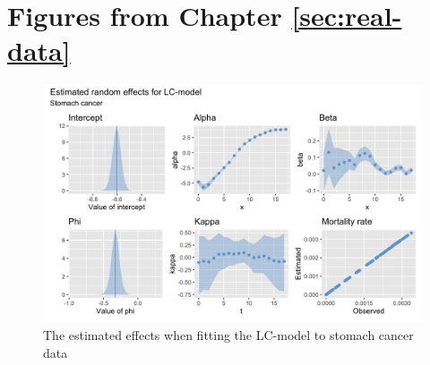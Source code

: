 \setcounter{table}{0}
\renewcommand{\thetable}{A\arabic{table}}
\setcounter{figure}{0}
\renewcommand{\thefigure}{A\arabic{figure}}

\section{Figures from Chapter \ref{sec:real-data}}

\begin{figure}[h!]
    \centering
    \includegraphics[width=0.85\linewidth]{real-data/real-data-univariate/Figures/uv-full-data-lc-s.png}
    \caption{The estimated effects when fitting the LC-model to stomach cancer data}
    \label{fig:uv-full-data-LC-s}
\end{figure}

